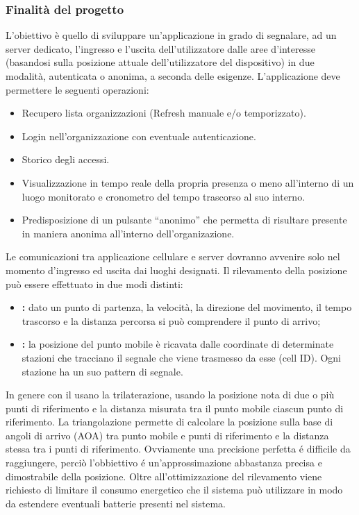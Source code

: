 	\subsubsection{Finalità del progetto}
		L’obiettivo è quello di sviluppare un’applicazione in grado di segnalare, ad un server dedicato, l’ingresso e l’uscita dell’utilizzatore dalle aree d’interesse (basandosi sulla posizione attuale dell'utilizzatore del dispositivo) in due modalità, autenticata o anonima, a seconda delle esigenze.
		L’applicazione deve permettere le seguenti operazioni: 
		\begin{itemize}
			\item Recupero lista organizzazioni (Refresh manuale e/o temporizzato).
			\item Login nell’organizzazione con eventuale autenticazione.
			\item Storico degli accessi.
			\item Visualizzazione in tempo reale della propria presenza o meno all’interno di un luogo monitorato e cronometro del tempo trascorso al suo interno.
			\item Predisposizione di un pulsante “anonimo” che permetta di risultare presente in maniera anonima all'interno dell'organizazione.
		\end{itemize}
		Le comunicazioni tra applicazione cellulare e server dovranno avvenire solo nel momento d'ingresso ed uscita dai luoghi designati. Il rilevamento della posizione può essere effettuato in due modi distinti:
		\begin{itemize}
			\item \textbf{:} dato un punto di partenza, la velocità, la direzione del movimento, il tempo trascorso e la distanza percorsa si può comprendere il punto di arrivo;
			\item \textbf{:} la posizione del punto mobile è ricavata dalle coordinate di determinate stazioni che tracciano il segnale che viene trasmesso da esse (cell ID). Ogni stazione ha un suo pattern di segnale.
		\end{itemize}
		In genere con il  usano la trilaterazione, usando la posizione nota di due o più punti di riferimento e la distanza misurata tra il punto mobile ciascun punto di riferimento. La triangolazione permette di calcolare la posizione sulla base di angoli di arrivo (AOA) tra punto mobile e punti di riferimento e la distanza stessa tra i punti di riferimento. Ovviamente una precisione perfetta é difficile da raggiungere, perciò l'obbiettivo é un'approssimazione abbastanza precisa e dimostrabile della posizione. Oltre all'ottimizzazione del rilevamento viene richiesto di limitare il consumo energetico che il sistema può utilizzare in modo da estendere eventuali batterie presenti nel sistema.

